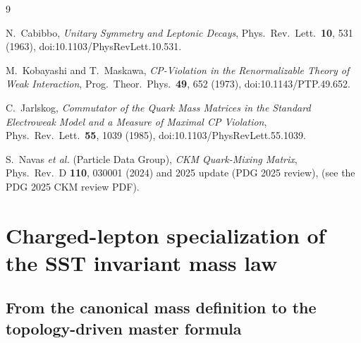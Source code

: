 \documentclass[10pt]{article}
\newcommand{\vswirl}{\mathbf{v}_{\!\boldsymbol{\circlearrowleft}}}
\begin{document}
        \begin{thebibliography}{9}

            N.~Cabibbo,
            \textit{Unitary Symmetry and Leptonic Decays},
            Phys.\ Rev.\ Lett.\ \textbf{10}, 531 (1963),
            doi:10.1103/PhysRevLett.10.531.

            M.~Kobayashi and T.~Maskawa,
            \textit{CP-Violation in the Renormalizable Theory of Weak Interaction},
            Prog.\ Theor.\ Phys.\ \textbf{49}, 652 (1973),
            doi:10.1143/PTP.49.652.

            C.~Jarlskog,
            \textit{Commutator of the Quark Mass Matrices in the Standard Electroweak Model and a Measure of Maximal CP Violation},
            Phys.\ Rev.\ Lett.\ \textbf{55}, 1039 (1985),
            doi:10.1103/PhysRevLett.55.1039.

            S.~Navas \textit{et al.} (Particle Data Group),
            \textit{CKM Quark-Mixing Matrix},
            Phys.\ Rev.\ D \textbf{110}, 030001 (2024) and 2025 update (PDG 2025 review),
            (see the PDG 2025 CKM review PDF).

        \end{thebibliography}


        \appendix
    \section{Charged-lepton specialization of the SST invariant mass law}
    \label{app:leptons_master_mass}

    \newcommand{\vswirl}{\mathbf{v}_{\!\boldsymbol{\circlearrowleft}}}
    \newcommand{\rhoF}{\rho_{\!f}}
    \newcommand{\rhoE}{\rho_{\!E}}
    \newcommand{\rhoM}{\rho_{\!m}}
    \newcommand{\rc}{r_c}

    \subsection{From the canonical mass definition to the topology-driven master formula}
\end{document}
